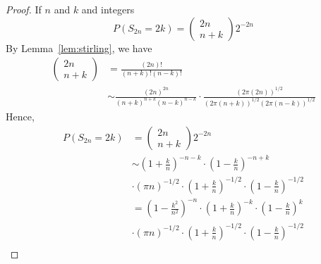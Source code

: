 \begin{proof}
	If \(n\) and \(k\) and integers
	\begin{equation*}
		P\left(S_{2 n}=2 k\right)=\left(\begin{array}{c}
				2 n \\
				n+k
			\end{array}\right) 2^{-2 n}
	\end{equation*}
	By Lemma~\ref{lem:stirling}, we have
	\begin{equation*}
		\begin{aligned}
			\left(\begin{array}{c}
					      2 n \\
					      n+k
				      \end{array}\right) & =\frac{(2 n)!}{(n+k)!(n-k)!}                                                                                              \\
			                       & \sim \frac{(2 n)^{2 n}}{(n+k)^{n+k}(n-k)^{n-k}} \cdot \frac{(2 \pi(2 n))^{1 / 2}}{(2 \pi(n+k))^{1 / 2}(2 \pi(n-k))^{1 / 2}}
		\end{aligned}
	\end{equation*}
	Hence,
	\begin{equation*}
		\begin{aligned}
			P\left(S_{2 n}=2 k\right) & =
			\left(\begin{array}{c}
					      2 n \\
					      n+k
				      \end{array}\right) 2^{-2 n}                                                                                                             \\
			                          & \sim\left(1+\frac{k}{n}\right)^{-n-k} \cdot\left(1-\frac{k}{n}\right)^{-n+k}                                      \\
			                          & \cdot(\pi n)^{-1 / 2} \cdot\left(1+\frac{k}{n}\right)^{-1 / 2} \cdot\left(1-\frac{k}{n}\right)^{-1 / 2}           \\
			                          & =\left(1-\frac{k^{2}}{n^{2}}\right)^{-n} \cdot\left(1+\frac{k}{n}\right)^{-k} \cdot\left(1-\frac{k}{n}\right)^{k} \\
			                          & \cdot(\pi n)^{-1 / 2} \cdot\left(1+\frac{k}{n}\right)^{-1 / 2} \cdot\left(1-\frac{k}{n}\right)^{-1 / 2}           \\
		\end{aligned}
	\end{equation*}

\end{proof}
